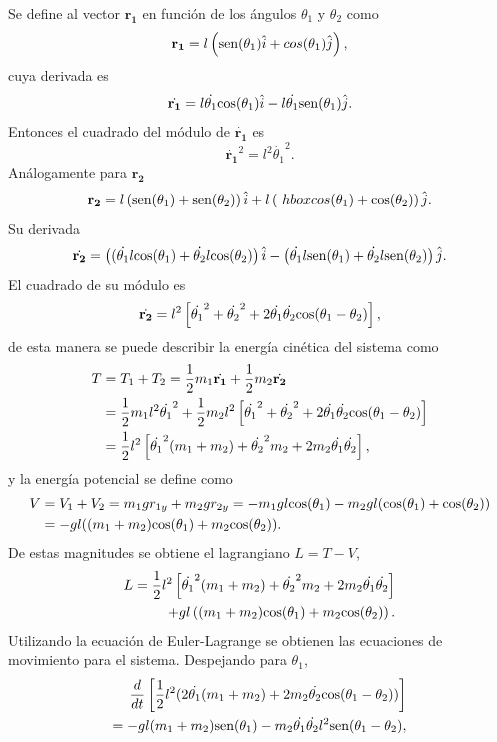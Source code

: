 \documentclass[letterpaper,11pt]{article}
\renewcommand{\vec}[1]{\mathbf{#1}}
\begin{document}
Se define al vector $\vec{r_1}$ en función de los ángulos $\theta_1$ y $\theta_2$ como
\[
	\vec{r_1} = l \left(\hbox{sen}(\theta_1)\hat{i} + cos(\theta_1)\hat{j} \right) ,
\]
cuya derivada es
\[
	\dot{\vec{r_1}} = l\dot{\theta_1} \hbox{cos}(\theta_1)\hat{i}-l\dot{\theta_1} \hbox{sen}(\theta_1)\hat{j}.
\]
Entonces el cuadrado del módulo de $\dot{\vec{r_1}}$ es
\begin{equation}
	\dot{\vec{r_1}}^2 = l^2 \dot{\theta_1}^2.
\end{equation}
Análogamente para $\vec{r_2}$
\[
	\vec{r_2} = l \left( \hbox{sen}(\theta_1) + \hbox{sen}(\theta_2) \right) \hat{i} + l \left(\ hbox{cos}(\theta_1) + \hbox{cos}(\theta_2) \right) \hat{j}.
\]
Su derivada
\[
	\dot{\vec{r_2}} = \left((\dot{\theta_1}l \hbox{cos}(\theta_1) + \dot{\theta_2}l \hbox{cos}(\theta_2) \right) \hat{i} - \left(\dot{\theta_1}l \hbox{sen} (\theta_1) + \dot{\theta_2}l \hbox{sen} (\theta_2) \right) \hat{j}.
\]
El cuadrado de su módulo es
\begin{equation}
	\dot{\vec{r_2}} = l^2 \left[\dot{\theta_1}^2 + \dot{\theta_2}^2 + 2\dot{\theta_1}\dot{\theta_2} \hbox{cos}(\theta_1-\theta_2) \right],
\end{equation}
de esta manera se puede describir la energía cinética del sistema como
\begin{align}
	T &= T_1 + T_2 = \frac{1}{2} m_1 \dot{\vec{r_1}} + \frac{1}{2} m_2 \dot{\vec{r_2}} \nonumber \\
	 &= \frac{1}{2} m_1 l^2 \dot{\theta_1}^2 + \frac{1}{2} m_2 l^2 \left[\dot{\theta_1}^2 + \dot{\theta_2}^2 + 2\dot{\theta_1}\dot{\theta_2} \hbox{cos}(\theta_1-\theta_2) \right] \nonumber \\
	 &= \frac{1}{2} l^2 \left[\dot{\theta_1}^2 (m_1 + m_2) + \dot{\theta_2}^2 m_2 + 2 m_2 \dot{\theta_1} \dot{\theta_2} \right] \nonumber,
\end{align}
y la energía potencial se define como
\begin{align}
	V &= V_1 + V_2 = m_1 g r_{1y} + m_2 g r_{2y} = -m_1 g l \hbox{cos}(\theta_1) - m_2 g l( \hbox{cos}(\theta_1)+ \hbox{cos}(\theta_2)) \nonumber \\
	  &= -gl((m_1+m_2) \hbox{cos} (\theta_1)+m_2 \hbox{cos}(\theta_2)) \nonumber.
\end{align}
De estas magnitudes se obtiene el lagrangiano $L = T - V$,
\begin{align}
	L = \frac{1}{2} l^2 \left[\dot{\theta_1}^2 (m_1 + m_2) + \dot{\theta_2}^2 m_2 + 2 m_2 \dot{\theta_1} \dot{\theta_2} \right] \nonumber \\
				+ gl \left((m_1+m_2) \hbox{cos} (\theta_1)+m_2 \hbox{cos}(\theta_2) \right).
\end{align}
Utilizando la ecuación de Euler-Lagrange se obtienen las ecuaciones de movimiento para el sistema.
Despejando para $\theta_1$,
\begin{align}
	{d\over dt }\left[ \frac{1}{2} l^2 (2 \dot{\theta_1}(m_1 + m_2) + 2m_2 \dot{\theta_2} \hbox{cos} (\theta_1 - \theta_2)) \right] \nonumber \\
	= -gl(m_1 + m_2) \hbox{sen} (\theta_1) - m_2 \dot{\theta_1} \dot{\theta_2} l^2 \hbox{sen} (\theta_1 - \theta_2) \nonumber,
\end{align}
\end{document}
